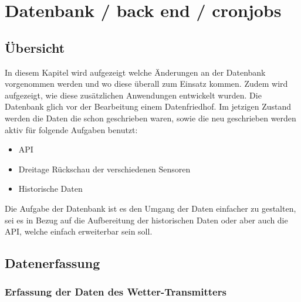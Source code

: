 \section{Datenbank / back end / cronjobs}


\subsection{Übersicht}

In diesem Kapitel wird aufgezeigt welche Änderungen an der Datenbank vorgenommen werden und wo diese überall zum Einsatz kommen. Zudem wird aufgezeigt, wie diese zusätzlichen Anwendungen entwickelt wurden. Die Datenbank glich vor der Bearbeitung einem Datenfriedhof. Im jetzigen Zustand werden die Daten die schon geschrieben waren, sowie die neu geschrieben werden aktiv für folgende Aufgaben benutzt:\\
\begin{itemize}
\item API
\item Dreitage Rückschau der verschiedenen Sensoren
\item Historische Daten
\end{itemize}

Die Aufgabe der Datenbank ist es den Umgang der Daten einfacher zu gestalten, sei es in Bezug auf die Aufbereitung der historischen Daten oder aber auch die API, welche einfach erweiterbar sein soll.



\subsection{Datenerfassung}
\subsubsection{Erfassung der Daten des Wetter-Transmitters}
\newline
{}\newline

